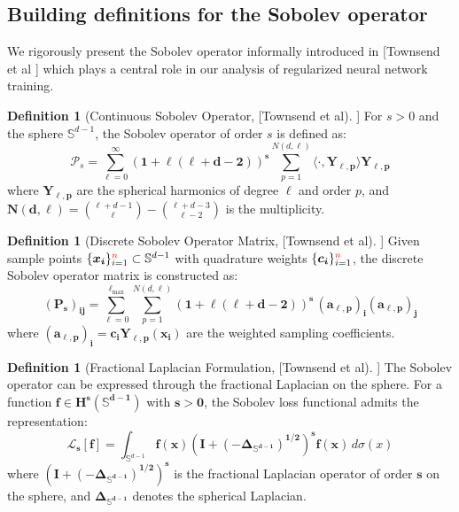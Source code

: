 \documentclass[a4paper]{article}
\theoremstyle{plain}
\theoremstyle{definition}
\newtheorem{definition}[theorem]{Definition}
\theoremstyle{remark}
\begin{document}
\subsection{Building definitions for the Sobolev operator}

We rigorously present the Sobolev operator informally introduced in [Townsend et al ] which plays a central role in our analysis of regularized neural network training.


\begin{definition}[Continuous Sobolev Operator, [Townsend et al]]
\label{def:sobolev_continuous}
For $s > 0$ and the sphere $\mathbb{S}^{d-1}$, the Sobolev operator of order $s$ is defined as:
\begin{equation}
\label{eq:sobolev_continuous}
\mathcal{P}_s = \sum_{\ell=0}^{\infty} \boldsymbol{(1 + \ell(\ell + d - 2))^s} \sum_{p=1}^{N(d,\ell)} \langle \cdot, \boldsymbol{Y_{\ell,p}} \rangle \boldsymbol{Y_{\ell,p}}
\end{equation}
where $\boldsymbol{Y_{\ell,p}}$ are the spherical harmonics of degree $\ell$ and order $p$, and $\boldsymbol{N(d,\ell)} = \binom{\ell+d-1}{\ell} - \binom{\ell+d-3}{\ell-2}$ is the multiplicity.
\end{definition}

\begin{definition}[Discrete Sobolev Operator Matrix, [Townsend et al]]
\label{def:sobolev_discrete}
Given sample points $\{\boldsymbol{x_i}\}_{i=1}^{\textcolor{red}{n}} \subset \mathbb{S}^{d-1}$ with quadrature weights $\{\boldsymbol{c_i}\}_{i=1}^{\textcolor{red}{n}}$, the discrete Sobolev operator matrix is constructed as:
\begin{equation}
\label{eq:sobolev_discrete}
\boldsymbol{(P_s)_{ij}} = \sum_{\ell=0}^{\ell_{\max}} \sum_{p=1}^{N(d,\ell)} \boldsymbol{(1 + \ell(\ell + d - 2))^s} \, \boldsymbol{(a_{\ell,p})_i} \boldsymbol{(a_{\ell,p})_j}
\end{equation}
where $\boldsymbol{(a_{\ell,p})_i} = \boldsymbol{c_i} \boldsymbol{Y_{\ell,p}(x_i)}$ are the weighted sampling coefficients.
\end{definition}

\begin{definition}[Fractional Laplacian Formulation, [Townsend et al]]
\label{def:fractional_laplacian}
The Sobolev operator can be expressed through the fractional Laplacian on the sphere. For a function $\boldsymbol{f \in H^s(\mathbb{S}^{d-1})}$ with $\boldsymbol{s > 0}$, the Sobolev loss functional admits the representation:
\begin{equation}
\label{eq:fractional_laplacian}
\boldsymbol{\mathcal{L}_s[f]} = \int_{\mathbb{S}^{d-1}} \boldsymbol{f(x)} \boldsymbol{(I + (-\Delta_{\mathbb{S}^{d-1}})^{1/2})^s} \boldsymbol{f(x)} \, d\sigma(x)
\end{equation}
where $\boldsymbol{(I + (-\Delta_{\mathbb{S}^{d-1}})^{1/2})^s}$ is the fractional Laplacian operator of order $\boldsymbol{s}$ on the sphere, and $\boldsymbol{\Delta_{\mathbb{S}^{d-1}}}$ denotes the spherical Laplacian.
\end{definition}
\end{document}
